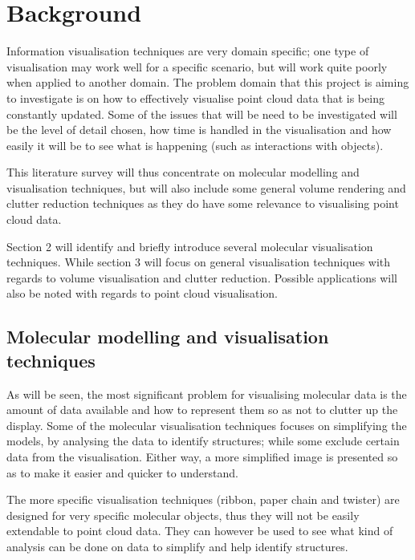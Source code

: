 \graphicspath{{./background/}}

\section{Background}
\label{sec:background}

Information visualisation techniques are very domain specific; one type of
visualisation may work well for a specific scenario, but will work quite poorly
when applied to another domain. The problem domain that this project is aiming
to investigate is on how to effectively visualise point cloud data that is
being constantly updated. Some of the issues that will be need to be
investigated will be the level of detail chosen, how time is handled in the
visualisation and how easily it will be to see what is happening (such as
interactions with objects).

This literature survey will thus concentrate on molecular modelling and
visualisation techniques, but will also include some general volume rendering
and clutter reduction techniques as they do have some relevance to visualising
point cloud data.

Section 2 will identify and briefly introduce several molecular visualisation
techniques. While section 3 will focus on general visualisation techniques with
regards to volume visualisation and clutter reduction. Possible applications
will also be noted with regards to point cloud visualisation.


\subsection{Molecular modelling and visualisation techniques}
\label{sub:molecular_modeling}

As will be seen, the most significant problem for visualising molecular data is
the amount of data available and how to represent them so as not to clutter up
the display. Some of the molecular visualisation techniques focuses on
simplifying the models, by analysing the data to identify structures; while some
exclude certain data from the visualisation. Either way, a more simplified image
is presented so as to make it easier and quicker to understand.

The more specific visualisation techniques (ribbon, paper chain and twister) are
designed for very specific molecular objects, thus they will not be easily
extendable to point cloud data. They can however be used to see what kind of
analysis can be done on data to simplify and help identify structures.

